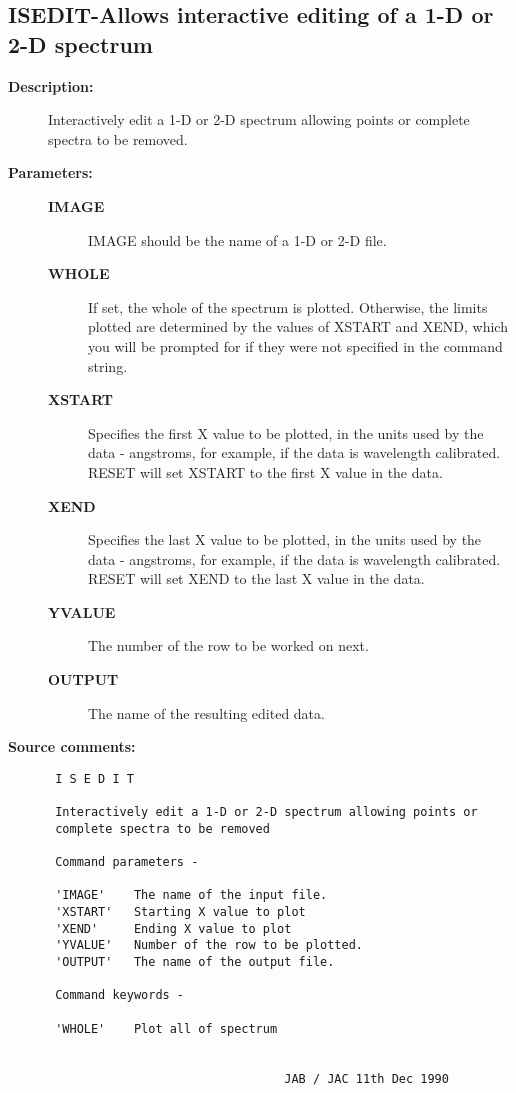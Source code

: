 \subsection{ISEDIT-\label{ISEDIT}Allows interactive editing of a 1-D or 2-D spectrum}
\begin{description}

\item [{\bf Description:}]
 Interactively edit a 1-D or 2-D spectrum allowing points or
 complete spectra to be removed.

\item [{\bf Parameters:}]
\begin{description}
\item [{\bf IMAGE}]
 IMAGE should be the name of a 1-D or 2-D file.
\item [{\bf WHOLE}]
 If set, the whole of the spectrum is plotted.
 Otherwise, the limits plotted are determined by the
 values of XSTART and XEND, which you will be prompted
 for if they were not specified in the command string.
\item [{\bf XSTART}]
 Specifies the first X value to be plotted, in the units used
 by the data - angstroms, for example, if the data is wavelength
 calibrated.  RESET will set XSTART to the first X value in the data.
\item [{\bf XEND}]
 Specifies the last X value to be plotted, in the units used by
 the data - angstroms, for example, if the data is wavelength
 calibrated.  RESET will set XEND to the last X value in the data.
\item [{\bf YVALUE}]
 The number of the row to be worked on next.
\item [{\bf OUTPUT}]
 The name of the resulting edited data.
\end{description}

\item [{\bf Source comments:}]
\begin{verbatim}
 I S E D I T

 Interactively edit a 1-D or 2-D spectrum allowing points or
 complete spectra to be removed

 Command parameters -

 'IMAGE'    The name of the input file.
 'XSTART'   Starting X value to plot
 'XEND'     Ending X value to plot
 'YVALUE'   Number of the row to be plotted.
 'OUTPUT'   The name of the output file.

 Command keywords -

 'WHOLE'    Plot all of spectrum


                                 JAB / JAC 11th Dec 1990
\end{verbatim}
\end{description}
